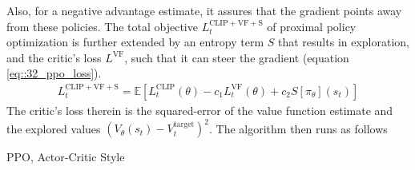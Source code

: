 Also, for a negative advantage estimate, it assures that the gradient points away from these policies. The total objective $L_t^{\text{CLIP}+\text{VF}+\text{S}}$ of proximal policy optimization is further extended by an entropy term $S$ that results in exploration, and the critic's loss $L^\text{VF}$, such that it can steer the gradient (equation \ref{eq::32_ppo_loss}).
\begin{align}
	L_t^{\text{CLIP}+\text{VF}+\text{S}} = \mathbb{E}\left[L_t^\text{CLIP}(\theta)-c_1L_t^\text{VF}(\theta)+c_2S\left[\pi_\theta\right](s_t)\right]
	\label{eq::32_ppo_loss}
\end{align}
The critic's loss therein is the squared-error of the value function estimate and the explored values $(V_\theta(s_t)-V^\text{target}_t)^2$. The algorithm then runs as follows
\begin{algorithm}
	\SetAlgoLined
	\caption{PPO, Actor-Critic Style}
	\label{alg::32_ac}
\end{algorithm}